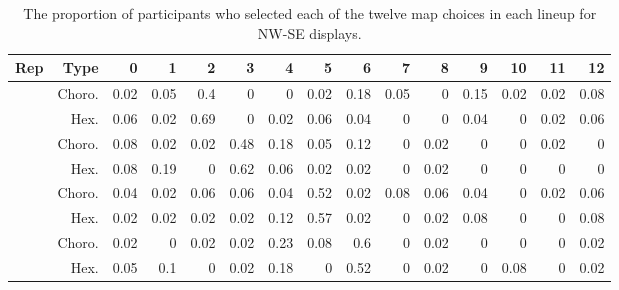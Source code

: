 \documentclass{monashthesis}
\begin{document}
\begin{Shaded}
\end{Shaded}

\begin{table}

\caption{\label{tab:choice-nwse}The proportion of participants who selected each of the twelve map choices in each lineup for NW-SE displays.}
\centering
\begin{tabular}[t]{r|r|r|r|r|r|r|r|r|r|r|r|r|r|r}
\hline
Rep & Type & 0 & 1 & 2 & 3 & 4 & 5 & 6 & 7 & 8 & 9 & 10 & 11 & 12\\
\hline
 & Choro. & 0.02 & 0.05 & 0.4 & 0 & 0 & 0.02 & 0.18 & 0.05 & 0 & 0.15 & 0.02 & 0.02 & 0.08\\
\cline{2-15}
\multirow{-2}{*}{\raggedleft\arraybackslash 1} & Hex. & 0.06 & 0.02 & 0.69 & 0 & 0.02 & 0.06 & 0.04 & 0 & 0 & 0.04 & 0 & 0.02 & 0.06\\
\cline{1-15}
 & Choro. & 0.08 & 0.02 & 0.02 & 0.48 & 0.18 & 0.05 & 0.12 & 0 & 0.02 & 0 & 0 & 0.02 & 0\\
\cline{2-15}
\multirow{-2}{*}{\raggedleft\arraybackslash 2} & Hex. & 0.08 & 0.19 & 0 & 0.62 & 0.06 & 0.02 & 0.02 & 0 & 0.02 & 0 & 0 & 0 & 0\\
\cline{1-15}
 & Choro. & 0.04 & 0.02 & 0.06 & 0.06 & 0.04 & 0.52 & 0.02 & 0.08 & 0.06 & 0.04 & 0 & 0.02 & 0.06\\
\cline{2-15}
\multirow{-2}{*}{\raggedleft\arraybackslash 3} & Hex. & 0.02 & 0.02 & 0.02 & 0.02 & 0.12 & 0.57 & 0.02 & 0 & 0.02 & 0.08 & 0 & 0 & 0.08\\
\cline{1-15}
 & Choro. & 0.02 & 0 & 0.02 & 0.02 & 0.23 & 0.08 & 0.6 & 0 & 0.02 & 0 & 0 & 0 & 0.02\\
\cline{2-15}
\multirow{-2}{*}{\raggedleft\arraybackslash 4} & Hex. & 0.05 & 0.1 & 0 & 0.02 & 0.18 & 0 & 0.52 & 0 & 0.02 & 0 & 0.08 & 0 & 0.02\\
\hline
\end{tabular}
\end{table}
\end{document}

